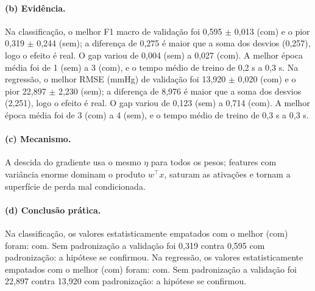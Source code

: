 \documentclass[11pt,a4paper]{article}
\begin{document}
\paragraph{(b) Evidência.} Na classificação, o melhor F1 macro de validação foi 0,595 $\pm$ 0,013 (com) e o pior 0,319 $\pm$ 0,244 (sem); a diferença de 0,275 é maior que a soma dos desvios (0,257), logo o efeito é real. O gap variou de 0,004 (sem) a 0,027 (com). A melhor época média foi de 1 (sem) a 3 (com), e o tempo médio de treino de 0,2 s a 0,3 s. Na regressão, o melhor RMSE (mmHg) de validação foi 13,920 $\pm$ 0,020 (com) e o pior 22,897 $\pm$ 2,230 (sem); a diferença de 8,976 é maior que a soma dos desvios (2,251), logo o efeito é real. O gap variou de 0,123 (sem) a 0,714 (com). A melhor época média foi de 3 (com) a 4 (sem), e o tempo médio de treino de 0,3 s a 0,3 s.

\paragraph{(c) Mecanismo.} A descida do gradiente usa o mesmo $\eta$ para todos os pesos; features com variância enorme dominam o produto $w^\top x$, saturam as ativações e tornam a superfície de perda mal condicionada.

\paragraph{(d) Conclusão prática.} Na classificação, os valores estatisticamente empatados com o melhor (com) foram: com. Sem padronização a validação foi 0,319 contra 0,595 com padronização: a hipótese se confirmou. Na regressão, os valores estatisticamente empatados com o melhor (com) foram: com. Sem padronização a validação foi 22,897 contra 13,920 com padronização: a hipótese se confirmou.
\end{document}
